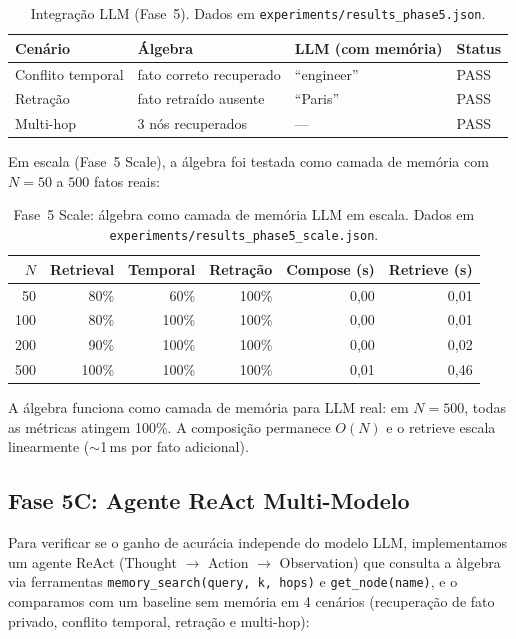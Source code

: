\documentclass[11pt,a4paper]{article}
\theoremstyle{definition}
\begin{document}
\begin{table}[h]
\centering
\begin{tabular}{llll}
\toprule
\textbf{Cen\'ario} & \textbf{\'Algebra} & \textbf{LLM (com mem\'oria)} & \textbf{Status} \\
\midrule
Conflito temporal & fato correto recuperado & ``engineer'' & PASS \\
Retra\c{c}\~ao & fato retra\'ido ausente & ``Paris'' & PASS \\
Multi-hop & 3 n\'os recuperados & --- & PASS \\
\bottomrule
\end{tabular}
\caption{Integra\c{c}\~ao LLM (Fase~5). Dados em \texttt{experiments/results\_phase5.json}.}
\end{table}

Em escala (Fase~5 Scale), a \'algebra foi testada como camada de mem\'oria com $N = 50$ a $500$ fatos reais:

\begin{table}[h]
\centering
\begin{tabular}{rrrrrr}
\toprule
$N$ & Retrieval & Temporal & Retra\c{c}\~ao & Compose (s) & Retrieve (s) \\
\midrule
50 & 80\% & 60\% & 100\% & 0,00 & 0,01 \\
100 & 80\% & 100\% & 100\% & 0,00 & 0,01 \\
200 & 90\% & 100\% & 100\% & 0,00 & 0,02 \\
500 & 100\% & 100\% & 100\% & 0,01 & 0,46 \\
\bottomrule
\end{tabular}
\caption{Fase~5 Scale: \'algebra como camada de mem\'oria LLM em escala. Dados em \texttt{experiments/results\_phase5\_scale.json}.}
\end{table}

A \'algebra funciona como camada de mem\'oria para LLM real: em $N = 500$, todas as m\'etricas atingem 100\%. A composi\c{c}\~ao permanece $O(N)$ e o retrieve escala linearmente ($\sim$1\,ms por fato adicional).

\subsection{Fase 5C: Agente ReAct Multi-Modelo}

Para verificar se o ganho de acur\'acia independe do modelo LLM, implementamos um agente ReAct (Thought $\to$ Action $\to$ Observation) que consulta a \`algebra via ferramentas \texttt{memory\_search(query, k, hops)} e \texttt{get\_node(name)}, e o comparamos com um baseline sem mem\'oria em 4 cen\'arios (recupera\c{c}\~ao de fato privado, conflito temporal, retra\c{c}\~ao e multi-hop):
\end{document}

